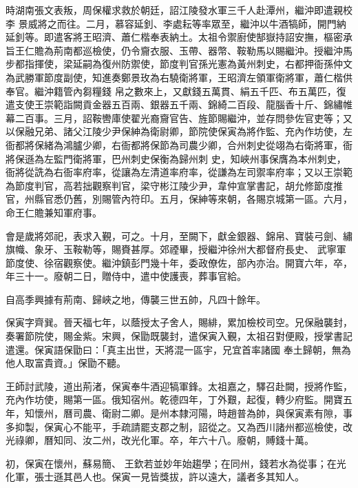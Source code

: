 \begin{pinyinscope}
 時湖南張文表叛，周保權求救於朝廷，詔江陵發水軍三千人赴潭州，繼沖即遣親校李
 景威將之而往。二月，慕容延釗、李處耘等率眾至，繼沖以牛酒犒師，開門納延釗等。即遣客將王昭濟、蕭仁楷奉表納土。太祖令禦廚使郜嶽持詔安撫，樞密承旨王仁贍為荊南都巡檢使，仍令齎衣服、玉帶、器幣、鞍勒馬以賜繼沖。授繼沖馬步都指揮使，梁延嗣為復州防禦使，節度判官孫光憲為黃州刺史，右都押衙孫仲文為武勝軍節度副使，知進奏鄭景玫為右驍衛將軍，王昭濟左領軍衛將軍，蕭仁楷供奉官。繼沖籍管內芻糧錢
 帛之數來上，又獻錢五萬貫、絹五千匹、布五萬匹，復遣支使王崇範詣闕貢金器五百兩、銀器五千兩、錦綺二百段、龍腦香十斤、錦繡帷幕二百事。三月，詔鞍轡庫使翟光裔齎官告、旌節賜繼沖，並存問參佐官吏等；又以保融兄弟、諸父江陵少尹保紳為衛尉卿，節院使保寅為將作監、充內作坊使，左衙都將保緒為鴻臚少卿，右衙都將保節為司農少卿，合州刺史從翊為右衛將軍，衙將保遜為左監門衛將軍，巴州刺史保衡為歸州刺
 史，知峽州事保膺為本州刺史，衙將從詵為右衙率府率，從讓為左清道率府率，從謙為左司禦率府率；又以王崇範為節度判官，高若拙觀察判官，梁守彬江陵少尹，韋仲宣掌書記，胡允修節度推官，州縣官悉仍舊，別賜管內符印。五月，保紳等來朝，各賜京城第一區。六月，命王仁贍兼知軍府事。



 會是歲將郊祀，表求入覲，可之。十月，至闕下，獻金銀器、錦帛、寶裝弓劍、繡旗幟、象牙、玉鞍勒等，賜賚甚厚。郊禋畢，授繼沖徐州大都督府長史、
 武寧軍節度使、徐宿觀察使。繼沖鎮彭門幾十年，委政僚佐，部內亦治。開寶六年，卒，年三十一。廢朝二日，贈侍中，遣中使護喪，葬事官給。



 自高季興據有荊南、歸峽之地，傳襲三世五帥，凡四十餘年。



 保寅字齊巽。晉天福七年，以蔭授太子舍人，賜緋，累加檢校司空。兄保融襲封，奏署節院使，賜金紫。宋興，保勖既襲封，遣保寅入覲，太祖召對便殿，授掌書記遣還。保寅語保勖曰：「真主出世，天將混一區宇，兄宜首率諸國
 奉土歸朝，無為他人取富貴資。」保勖不聽。



 王師討武陵，道出荊渚，保寅奉牛酒迎犒軍鋒。太祖嘉之，驛召赴闕，授將作監，充內作坊使，賜第一區。俄知宿州。乾德四年，丁外艱，起復，轉少府監。開寶五年，知懷州，曆司農、衛尉二卿。是州本隸河陽，時趙普為帥，與保寅素有隙，事多抑製，保寅心不能平，手疏請罷支郡之制，詔從之。又為西川諸州都巡檢使，改光祿卿，曆知同、汝二州，改光化軍。卒，年六十八。廢朝，賻錢十萬。



 初，保寅在懷州，蘇易簡、
 王欽若並妙年始趨學；在同州，錢若水為從事；在光化軍，張士遜其邑人也。保寅一見皆獎拔，許以遠大，議者多其知人。




\end{pinyinscope}
